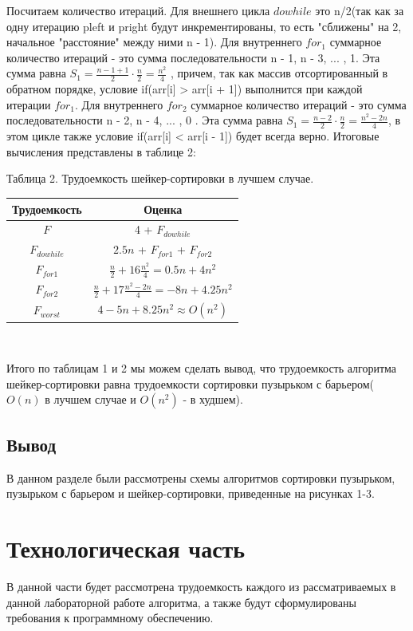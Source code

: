 \documentclass[a4paper, 14pt]{article}
\begin{document}
		Посчитаем количество итераций. Для внешнего цикла $do while$ это n/2(так как за одну итерацию pleft и pright будут инкрементированы, то есть "сближены" на 2, начальное "расстояние" между ними n - 1). Для внутреннего $for_{1}$ суммарное количество итераций - это сумма последовательности n - 1, n - 3, ... , 1. Эта сумма равна $S_{1} = \frac{n - 1 + 1}{2}\cdot \frac{n}{2} = \frac{n^2}{4}$ , причем, так как массив отсортированный в обратном порядке, условие if(arr[i] > arr[i + 1]) выполнится при каждой итерации $for_{1}$.  Для внутреннего $for_{2}$ суммарное количество итераций - это сумма последовательности n - 2, n - 4, ... , 0 . Эта сумма равна $S_{1} = \frac{n - 2}{2}\cdot \frac{n}{2} = \frac{n^2 - 2n}{4}$, в этом цикле также условие if(arr[i] < arr[i - 1]) будет всегда верно. Итоговые вычисления представлены в таблице 2:\\
        	\begin{center}
  	Таблица 2. Трудоемкость шейкер-сортировки в лучшем случае.\\
  		
		\begin{tabular}{ | c | c | }
        \hline
		Трудоемкость & Оценка\\ \hline
		$F$ & 4 + $F_{dowhile}$\\ \hline
		$F_{dowhile}$ & $2.5n$ + $F_{for1}$ + $F_{for2}$\\ \hline
		$F_{for1}$ & $\frac{n}{2} + 16\frac{n^2}{4} = 0.5n + 4n^2$\\ \hline
		$F_{for2}$ & $\frac{n}{2} + 17\frac{n^2 - 2n}{4} = -8n + 4.25n^2$\\ \hline
		\textbf{$F_{worst}$} & \textbf{$4 - 5n + 8.25n^2 \approx O(n^2)$}\\ \hline
		\hline
        \end{tabular}\\
        \end{center}
        Итого по таблицам 1 и 2 мы можем сделать вывод, что трудоемкость алгоритма шейкер-сортировки равна трудоемкости сортировки пузырьком с барьером($O(n)$ в лучшем случае и $O(n^2)$ - в худшем).
		\subsection{Вывод}
		В данном разделе были рассмотрены схемы алгоритмов сортировки пузырьком, пузырьком с барьером и шейкер-сортировки, приведенные на рисунках 1-3.
		
		\newpage
		\section{Технологическая часть}
		В данной части будет рассмотрена трудоемкость каждого из рассматриваемых в данной лабораторной работе алгоритма, а также будут сформулированы требования к программному обеспечению.
\end{document}
